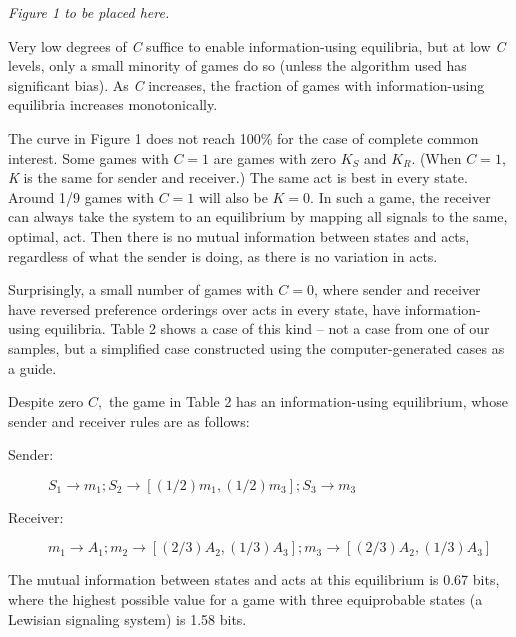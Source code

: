\documentclass[10pt]{article}
\begin{document}
\emph{Figure 1 to be placed here.}

Very low degrees of \emph{C} suffice to enable information-using
equilibria, but at low \emph{C} levels, only a small minority of games
do so (unless the algorithm used has significant bias). As \emph{C}
increases, the fraction of games with information-using equilibria
increases monotonically.

The curve in Figure 1 does not reach 100\% for the case of complete
common interest. Some games with $C=1$ are games with zero
$K_{S}$ and $K_{R}$. (When $C=1$, \emph{K} is the
same for sender and receiver.) The same act is best in every state. Around 1/9 games with $C=1$ will also be $K=0$. In such a game, the
receiver can always take the system to an equilibrium by mapping all
signals to the same, optimal, act. Then there is no mutual information
between states and acts, regardless of what the sender is doing, as
there is no variation in acts.

Surprisingly, a small number of games with $C=0$, where sender and
receiver have reversed preference orderings over acts in every state,
have information-using equilibria. Table 2 shows a case of this kind --
not a case from one of our samples, but a simplified case constructed
using the computer-generated cases as a guide.

Despite zero $C,$ the game in Table 2 has an information-using
equilibrium, whose sender and receiver rules are as follows:

\begin{description}
\item[Sender:]
$S_1\rightarrow m_1;S_2\rightarrow [(1/2)m_1, (1/2)m_3]; S_3\rightarrow m_3$
\item[Receiver:]
$m_1\rightarrow A_1; m_2\rightarrow [(2/3)A_2, (1/3)A_3]; m_3\rightarrow [(2/3)A_2, (1/3)A_3]$
\end{description}

The mutual information between states and acts at this equilibrium is
0.67 bits, where the highest possible value for a game with three
equiprobable states (a Lewisian signaling system) is 1.58 bits.
\end{document}
